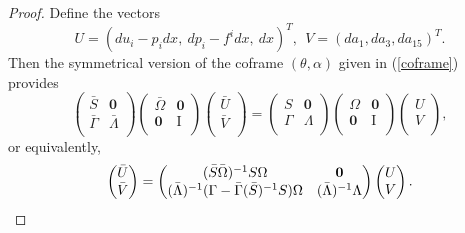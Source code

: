 \documentclass[12pt]{article}
\begin{document}
\begin{proof} 
Define the vectors $$U=(du_i-p_idx, ~dp_i-f^idx, ~dx)^{T},~~V=(da_1,da_3,da_{15})^{T}.$$ Then the symmetrical version of the coframe $(\theta,\alpha)$ given in (\ref{coframe}) provides
\begin{equation}
\begin{pmatrix}
\bar{S}&\textbf{0}\\
\bar{\Gamma}&\bar{\Lambda}\\
\end{pmatrix}\begin{pmatrix}
\bar{\Omega}&\textbf{0}\\
\textbf{0}&\text{I}\\
\end{pmatrix}\begin{pmatrix}
\bar{U}\\
\bar{V}\\
\end{pmatrix}=
\begin{pmatrix}
S&\textbf{0}\\
\Gamma&\Lambda\\
\end{pmatrix}\begin{pmatrix}
\Omega&\textbf{0}\\
\textbf{0}&\text{I}\\
\end{pmatrix}\begin{pmatrix}
U\\
V\\
\end{pmatrix},
\end{equation}
or equivalently,
\begin{equation}\label{141}
\begin{pmatrix}
\bar{U}\\
\bar{V}\\
\end{pmatrix}=
\begin{pmatrix}
(\bar{S}\bar{\Omega})^{-1}S\Omega&\textbf{0}\\
(\bar{\Lambda})^{-1}(\Gamma-\bar{\Gamma}(\bar{S})^{-1}S)\Omega&(\bar{\Lambda})^{-1}\Lambda\\
\end{pmatrix}\begin{pmatrix}
U\\
V\\
\end{pmatrix}.\\
\end{equation}

\end{proof}
\end{document}
